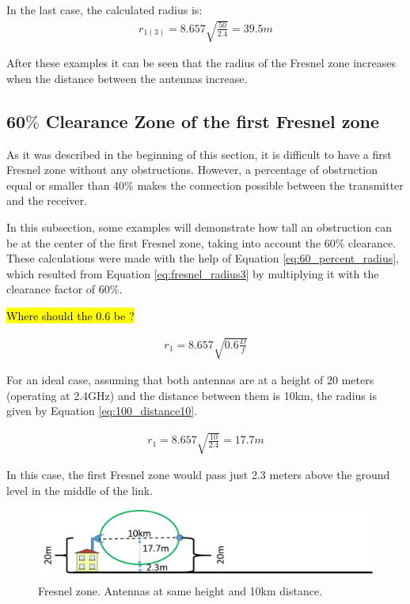 In the last case, the calculated radius is:
\begin{align*}
r_{1(3)} = 8.657\sqrt{\frac{50}{2.4}} = 39.5m
\end{align*}

After these examples it can be seen that the radius of the Fresnel zone increases when the distance between the antennas increase.

\subsection*{60$\%$ Clearance Zone of the first Fresnel zone}
As it was described in the beginning of this section, it is difficult to have a first Fresnel zone without any obstructions. However, a percentage of obstruction equal or smaller than 40$\%$ makes the connection possible between the transmitter and the receiver.

In this subsection, some examples will demonstrate how tall an obstruction can be at the center of the first Fresnel zone, taking into account the 60$\%$ clearance. These calculations were made with the help of Equation \ref{eq:60_percent_radius}, which resulted from Equation \ref{eq:fresnel_radius3} by multiplying it with the clearance factor of 60$\%$.

\hl{Where should the 0.6 be ?}

\begin{align}
r_1 = 8.657\sqrt{0.6\frac{D}{f}}\label{eq:60_percent_radius}
\end{align}

For an ideal case, assuming that both antennas are at a height of 20 meters (operating at 2.4GHz) and the distance between them is 10km, the radius is given by Equation \ref{eq:100_distance10}.

\begin{align}
r_1 = 8.657\sqrt{\frac{10}{2.4}} = 17.7m\label{eq:100_distance10}
\end{align}

In this case, the first Fresnel zone would pass just 2.3 meters above the ground level in the middle of the link. 

\begin{figure}[H]
	\centering
	\includegraphics[scale=0.50]{figures/fresnel_10km_height.png}
	\caption{Fresnel zone. Antennas at same height and 10km distance.}
	\label{fig:fresnel_zones_10km_height}
\end{figure}  

